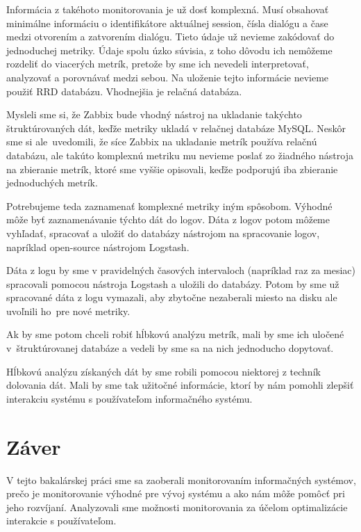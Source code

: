 \documentclass[a4paper, upjsfrontpage, disablespecwarning, thesismargins, thesislinespacing]{rnthesis}
\begin{document}
Informácia z takéhoto monitorovania je už dosť komplexná.
Musí obsahovať minimálne informáciu o identifikátore aktuálnej session, čísla dialógu a čase medzi otvorením a zatvorením dialógu.
Tieto údaje už nevieme zakódovať do jednoduchej metriky.
Údaje spolu úzko súvisia, z toho dôvodu ich nemôžeme rozdeliť do viacerých metrík, 
	pretože by sme ich nevedeli interpretovať, analyzovať a porovnávať medzi sebou.
Na uloženie tejto informácie nevieme použiť RRD databázu.
Vhodnejšia je relačná databáza.

Mysleli sme si, že Zabbix bude vhodný nástroj na ukladanie takýchto štruktúrovaných dát, 
	keďže metriky ukladá v relačnej databáze MySQL.
Neskôr sme si ale~uvedomili, že síce Zabbix na ukladanie metrík používa relačnú databázu, ale takúto komplexnú metriku mu nevieme poslať zo žiadného nástroja na zbieranie metrík, ktoré sme vyššie opisovali, keďže podporujú iba zbieranie jednoduchých metrík.

Potrebujeme teda zaznamenať komplexné metriky iným spôsobom.
Výhodné môže byť zaznamenávanie týchto dát do logov.
Dáta z logov potom môžeme vyhľadať, spracovať a uložiť do databázy nástrojom na spracovanie logov, napríklad open-source nástrojom Logstash.

Dáta z logu by sme v pravidelných časových intervaloch (napríklad raz za mesiac) spracovali pomocou nástroja Logstash a uložili do databázy.
Potom by sme už spracované dáta z logu vymazali, aby zbytočne nezaberali miesto na disku ale uvoľnili ho~pre nové metriky.

Ak by sme potom chceli robiť hĺbkovú analýzu metrík, mali by sme ich uločené v~štruktúrovanej databáze a vedeli by sme sa na nich jednoducho dopytovať.

Hĺbkovú analýzu získaných dát by sme robili pomocou niektorej z techník dolovania dát.
Mali by sme tak užitočné informácie, ktorí by nám pomohli zlepšiť interakciu systému s používateľom informačného systému.


\newpage


\chapter*{Záver}

V tejto bakalárskej práci sme sa zaoberali monitorovaním informačných systémov, prečo je monitorovanie výhodné pre vývoj systému a ako nám môže pomôcť pri jeho rozvíjaní.
Analyzovali sme možnosti monitorovania za účelom optimalizácie interakcie s používateľom.
\end{document}
